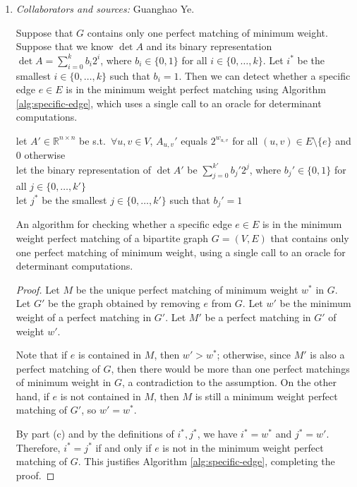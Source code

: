 \documentclass[letterpaper, reqno,11pt]{article}
\newcommand{\RR}{\mathbb{R}}
\begin{document}
\begin{enumerate}
\begin{enumerate}
    \clearpage

    \item \noindent\emph{Collaborators and sources:} Guanghao Ye.

    \bigskip

    Suppose that $G$ contains only one perfect matching of minimum weight. Suppose that we know $\det A$ and its binary representation $\det A = \sum_{i = 0}^k b_i 2^i$, where $b_i \in \{ 0, 1 \}$ for all $i \in \{ 0, \ldots, k \}$. Let $i^*$ be the smallest $i \in \{ 0, \ldots, k \}$ such that $b_i = 1$. Then we can detect whether a specific edge $e \in E$ is in the minimum weight perfect matching using Algorithm \ref{alg:specific-edge}, which uses a single call to an oracle for determinant computations.

    \begin{algorithm}
      let $A' \in \RR^{n \times n}$ be s.t.\ $\forall u, v \in V$, $A_{u, v}'$ equals $2^{w_{u, v}}$ for all $(u, v) \in E \setminus \{ e \}$ and $0$ otherwise \\
      let the binary representation of $\det A'$ be $\sum_{j = 0}^{k'} b_j' 2^j$, where $b_j' \in \{ 0, 1 \}$ for all $j \in \{ 0, \ldots, k' \}$ \\
      let $j^*$ be the smallest $j \in \{ 0, \ldots, k' \}$ such that $b_j' = 1$ \\
      \caption{An algorithm for checking whether a specific edge $e \in E$ is in the minimum weight perfect matching of a bipartite graph $G = (V, E)$ that contains only one perfect matching of minimum weight, using a single call to an oracle for determinant computations.}
      \label{alg:specific-edge}
    \end{algorithm}

    \begin{proof}
      Let $M$ be the unique perfect matching of minimum weight $w^*$ in $G$. Let $G'$ be the graph obtained by removing $e$ from $G$. Let $w'$ be the minimum weight of a perfect matching in $G'$. Let $M'$ be a perfect matching in $G'$ of weight $w'$.
      
      Note that if $e$ is contained in $M$, then $w' > w^*$; otherwise, since $M'$ is also a perfect matching of $G$, then there would be more than one perfect matchings of minimum weight in $G$, a contradiction to the assumption. On the other hand, if $e$ is not contained in $M$, then $M$ is still a minimum weight perfect matching of $G'$, so $w' = w^*$.

      By part (c) and by the definitions of $i^*, j^*$, we have $i^* = w^*$ and $j^* = w'$. Therefore, $i^* = j^*$ if and only if $e$ is not in the minimum weight perfect matching of $G$. This justifies Algorithm \ref{alg:specific-edge}, completing the proof.
    \end{proof}
  \end{enumerate}
\end{enumerate}
\end{document}
